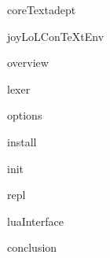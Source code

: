 
\usemodule[t-diSimp]

\startDiSimpComponent coreTextadept

\diSimpEnvironment joyLoLConTeXtEnv


\diSimpComponent overview

\diSimpComponent lexer

\diSimpComponent options

\diSimpComponent install

\diSimpComponent init

\diSimpComponent repl

\diSimpComponent luaInterface

\diSimpComponent conclusion

\stopJoyLoLCoAlg

\stopDiSimpComponent
